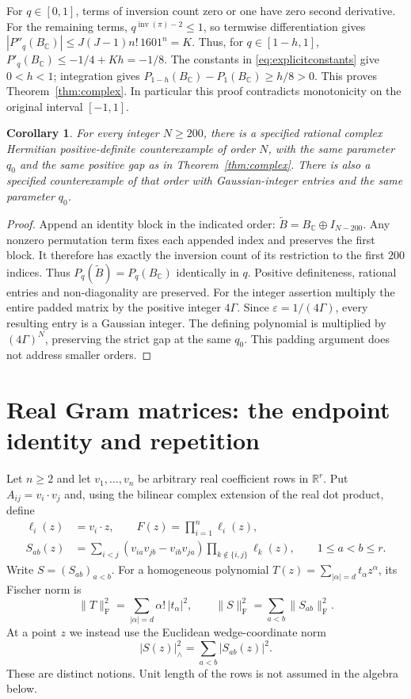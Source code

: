 \documentclass[11pt]{article}
\newtheorem{corollary}[theorem]{Corollary}
\theoremstyle{remark}
\DeclareMathOperator{\inv}{inv}
\newcommand{\R}{\mathbb R}
\newcommand{\C}{\mathbb C}
\newcommand{\normF}[1]{\lVert #1\rVert_{\mathrm F}}
\newcommand{\normW}[1]{\lvert #1\rvert_{\wedge}}
\begin{document}
For $q\in[0,1]$, terms of inversion count zero or one have zero
second derivative. For the remaining terms, $q^{\inv(\pi)-2}\le1$,
so termwise differentiation gives
$|P''_q(B_{\C})|\le J(J-1)n!\,1601^n=K$.
Thus, for $q\in[1-h,1]$,
$P'_q(B_{\C})\le-1/4+Kh=-1/8$. The constants in
\eqref{eq:explicitconstants} give $0<h<1$; integration gives
$P_{1-h}(B_{\C})-P_1(B_{\C})\ge h/8>0$.
This proves Theorem~\ref{thm:complex}. In particular this proof
contradicts monotonicity on the original interval $[-1,1]$.

\begin{corollary}\label{cor:padding}
For every integer $N\ge200$, there is a specified rational complex
Hermitian positive-definite counterexample of order $N$, with the same
parameter $q_0$ and the same positive gap as in
Theorem~\ref{thm:complex}.
There is also a specified counterexample of that order with
Gaussian-integer entries and the same parameter $q_0$.
\end{corollary}
\begin{proof}
Append an identity block in the indicated order:
$\widetilde B=B_{\C}\oplus I_{N-200}$. Any nonzero permutation term
fixes each appended index and preserves the first block. It therefore
has exactly the inversion count of its restriction to the first $200$
indices. Thus $P_q(\widetilde B)=P_q(B_{\C})$ identically in $q$.
Positive definiteness, rational entries and non-diagonality are
preserved. For the integer assertion multiply the entire padded matrix
by the positive integer $4\Gamma$. Since $\varepsilon=1/(4\Gamma)$,
every resulting entry is a Gaussian integer. The defining polynomial
is multiplied by $(4\Gamma)^N$, preserving the strict gap at the same
$q_0$. This padding argument does not address smaller orders.
\end{proof}

\section{Real Gram matrices: the endpoint identity and repetition}
Let $n\geq2$ and let $v_1,\ldots,v_n$ be arbitrary real coefficient rows in $\R^r$. Put $A_{ij}=v_i\cdot v_j$ and, using the bilinear complex extension of the real dot product, define
\begin{align}
 \ell_i(z)&=v_i\cdot z,\qquad F(z)=\prod_{i=1}^n\ell_i(z),\label{eq:forms}\\
 S_{ab}(z)&=\sum_{i<j}(v_{ia}v_{jb}-v_{ib}v_{ja})
                  \prod_{k\notin\{i,j\}}\ell_k(z),\qquad 1\leq a<b\leq r.
 \label{eq:wedge}
\end{align}
Write $S=(S_{ab})_{a<b}$. For a homogeneous polynomial $T(z)=\sum_{|\alpha|=d}t_\alpha z^\alpha$, its Fischer norm is
\[
 \normF{T}^2=\sum_{|\alpha|=d}\alpha!\,|t_\alpha|^2,
 \qquad \normF{S}^2=\sum_{a<b}\normF{S_{ab}}^2.
\]
At a point $z$ we instead use the Euclidean wedge-coordinate norm
\[
 \normW{S(z)}^2=\sum_{a<b}|S_{ab}(z)|^2.
\]
These are distinct notions. Unit length of the rows is not assumed in the algebra below.
\end{document}
